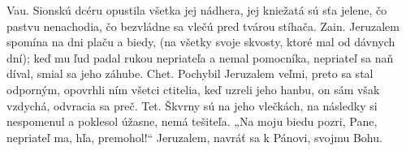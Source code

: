 Vau. 
Sionskú dcéru opustila
všetka jej nádhera,
jej kniežatá sú sťa jelene,
čo pastvu nenachodia,
čo bezvládne sa vlečú
pred tvárou stíhača.
\versseparator
Zain.
Jeruzalem spomína na dni
plaču a biedy,
(na všetky svoje skvosty,
ktoré mal od dávnych dní);
keď mu ľud padal rukou nepriateľa
a nemal pomocníka,
nepriateľ sa naň díval, smial sa
jeho záhube.
\versseparator
Chet.
Pochybil Jeruzalem veľmi,
preto sa stal odporným,
opovrhli ním všetci ctitelia,
keď uzreli jeho hanbu,
on sám však vzdychá,
odvracia sa preč.
\versseparator
Tet.
Škvrny sú na jeho vlečkách,
na následky si nespomenul
a poklesol úžasne,
nemá tešiteľa.
„Na moju biedu pozri, Pane,
nepriateľ ma, hľa, premohol!“
\versseparator
Jeruzalem, navráť sa k Pánovi, svojmu Bohu.